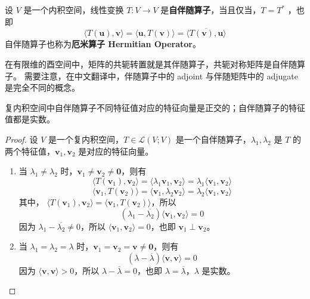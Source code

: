 \begin{definition}
    设 $V$ 是一个内积空间，线性变换 $T:V\to V$ 是\textbf{自伴随算子}，当且仅当，$T = T^*$ ，也即
    \[
        \langle T(\mathbf{u}),\mathbf{v} \rangle = \langle \mathbf{u},T(\mathbf{v}) \rangle = \overline{\langle T(\mathbf{v}),\mathbf{u} \rangle}
    \]
    自伴随算子也称为\textbf{厄米算子 Hermitian Operator}。
    \label{def:self_adjoint_operator}
\end{definition}

\begin{note}
    在有限维的酉空间中，矩阵的共轭转置就是其伴随算子，共轭对称矩阵是自伴随算子。
    需要注意，在中文翻译中，伴随算子中的 adjoint 与伴随矩阵中的 adjugate 是完全不同的概念。
\end{note}

\begin{proposition}
    复内积空间中自伴随算子不同特征值对应的特征向量是正交的；自伴随算子的特征值都是实数。
    \label{prop:self_adjoint_operator_eigenvalue}
\end{proposition}
\begin{proof}
    设 $V$ 是一个复内积空间，$T\in \mathcal{L}(V;V)$ 是一个自伴随算子，$\lambda_1,\lambda_2$ 是 $T$ 的两个特征值，$\mathbf{v}_1,\mathbf{v}_2$ 是对应的特征向量。
    \begin{enumerate}
        \item 当 $\lambda_1 \neq \lambda_2$ 时，$\mathbf{v}_1 \neq \mathbf{v}_2 \neq \mathbf{0}$，则有
        \[
            \langle T(\mathbf{v}_1),\mathbf{v}_2 \rangle = \langle \lambda_1 \mathbf{v}_1,\mathbf{v}_2 \rangle = \lambda_1 \langle \mathbf{v}_1,\mathbf{v}_2 \rangle
        \]
        \[
            \langle \mathbf{v}_1,T(\mathbf{v}_2) \rangle = \langle \mathbf{v}_1,\lambda_2 \mathbf{v}_2 \rangle = \overline{\lambda_2} \langle \mathbf{v}_1,\mathbf{v}_2 \rangle
        \]
        其中， $\langle T(\mathbf{v}_1),\mathbf{v}_2 \rangle = \langle \mathbf{v}_1,T(\mathbf{v}_2) \rangle$，所以
        \[
            (\lambda_1 - \overline{\lambda_2}) \langle \mathbf{v}_1,\mathbf{v}_2 \rangle =  0
        \]
        因为 $\lambda_1 - \overline{\lambda_2} \neq 0$，所以 $\langle \mathbf{v}_1,\mathbf{v}_2 \rangle = 0$，也即 $\mathbf{v}_1 \perp \mathbf{v}_2$。
        \item 当 $\lambda_1 = \lambda_2 = \lambda$ 时，$\mathbf{v}_1 = \mathbf{v}_2 = \mathbf{v} \neq \mathbf{0}$，则有
        \[
            (\lambda - \overline{\lambda}) \langle \mathbf{v},\mathbf{v} \rangle =  0
        \]
        因为 $\langle \mathbf{v},\mathbf{v} \rangle > 0$，所以 $\lambda - \overline{\lambda} = 0$，也即 $\lambda = \overline{\lambda}$，$\lambda$ 是实数。
    \end{enumerate}
\end{proof}

